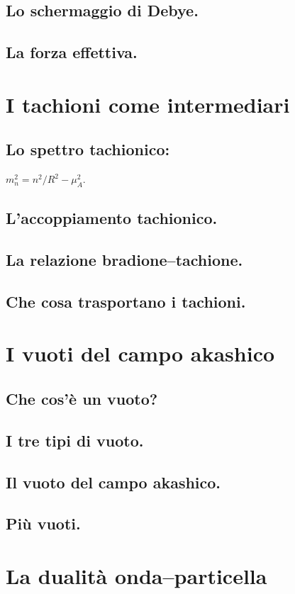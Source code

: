 \documentclass[11pt,a4paper]{article}
\begin{document}
\subsection{Lo schermaggio di Debye.}
\subsection{La forza effettiva.}

\section{I tachioni come intermediari}
\subsection{Lo spettro tachionico:} $m_n^2 = n^2/R^2 - \mu_A^2$.
\subsection{L'accoppiamento tachionico.}
\subsection{La relazione bradione--tachione.}
\subsection{Che cosa trasportano i tachioni.}

\section{I vuoti del campo akashico}
\subsection{Che cos'è un vuoto?}
\subsection{I tre tipi di vuoto.}
\subsection{Il vuoto del campo akashico.}
\subsection{Più vuoti.}

\section{La dualità onda--particella}
\end{document}
